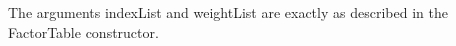 The arguments indexList and weightList are exactly as described in the FactorTable constructor.




%
%
%
%       
%

